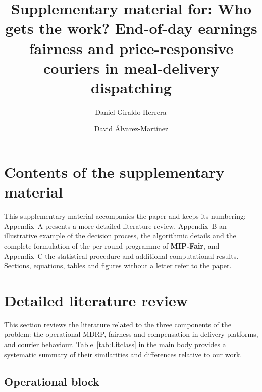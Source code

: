 \documentclass[a4paper,11pt,review,3p,authoryear]{elsarticle}
\begin{document}
\begin{frontmatter}

\title{Supplementary material for: Who gets the work? End-of-day earnings fairness and price-responsive couriers in meal-delivery dispatching}

\author[1]{Daniel Giraldo-Herrera\,}  
\author[1]{David \'Alvarez-Mart\'inez} 


\end{frontmatter}

\appendix
{}  %
\renewcommand{\thealgorithm}{\Alph{section}.\arabic{algorithm}} %

\section*{Contents of the supplementary material}

This supplementary material accompanies the paper and keeps its numbering: Appendix~A presents a more detailed literature review, Appendix~B an illustrative example of the decision process, the algorithmic details and the complete formulation of the per-round programme of \textbf{MIP-Fair}, and Appendix~C the statistical procedure and additional computational results. Sections, equations, tables and figures without a letter refer to the paper.

\section{Detailed literature review}
\label{sec:App_literature_review}

This section reviews the literature related to the three components of the problem: the operational MDRP, fairness and compensation in delivery platforms, and courier behaviour. Table~\ref{tab:Litclass} in the main body provides a systematic summary of their similarities and differences relative to our work.

\subsection{Operational block}
\label{sec:App_lit_operational}
\end{document}
